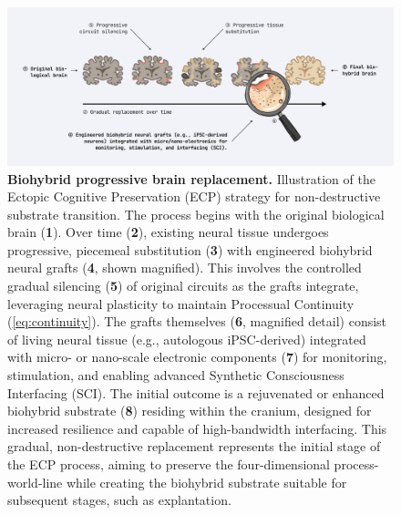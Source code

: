 \documentclass[10pt]{article}
\begin{document}
\begin{sloppypar}
  \begin{figure}[ht]
    \centering
    \includegraphics[width=\textwidth]{figures/ecp-brain-replacement.png}
    \caption[ECP: Biohybrid progressive brain replacement]{\textbf{Biohybrid progressive brain replacement.} Illustration of the Ectopic Cognitive Preservation (ECP) strategy for non-destructive substrate transition. The process begins with the original biological brain (\textbf{1}). Over time (\textbf{2}), existing neural tissue undergoes progressive, piecemeal substitution (\textbf{3}) with engineered biohybrid neural grafts (\textbf{4}, shown magnified). This involves the controlled gradual silencing (\textbf{5}) of original circuits as the grafts integrate, leveraging neural plasticity to maintain Processual Continuity (\autoref{eq:continuity}). The grafts themselves (\textbf{6}, magnified detail) consist of living neural tissue (e.g., autologous iPSC-derived) integrated with micro- or nano-scale electronic components (\textbf{7}) for monitoring, stimulation, and enabling advanced Synthetic Consciousness Interfacing (SCI). The initial outcome is a rejuvenated or enhanced biohybrid substrate (\textbf{8}) residing within the cranium, designed for increased resilience and capable of high-bandwidth interfacing. This gradual, non-destructive replacement represents the initial stage of the ECP process, aiming to preserve the four-dimensional process-world-line while creating the biohybrid substrate suitable for subsequent stages, such as explantation.}
    \label{fig:ecp-replacement}
  \end{figure}


\end{sloppypar}
\end{document}
